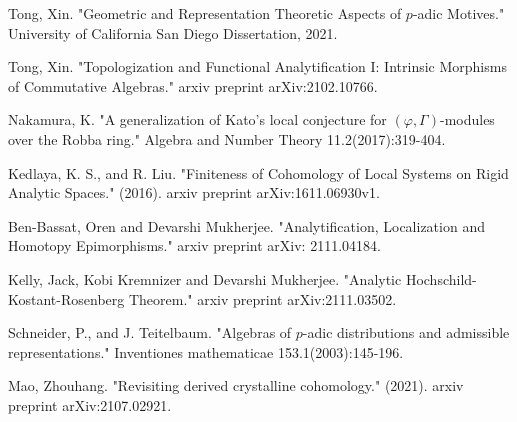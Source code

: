\documentclass[11pt]{report}
\begin{document}
\begin{thebibliography}{1}
 Tong, Xin. "Geometric and Representation Theoretic Aspects of $p$-adic Motives." University of California San Diego Dissertation, 2021.

 Tong, Xin. "Topologization and Functional Analytification I: Intrinsic Morphisms of Commutative Algebras." arxiv preprint arXiv:2102.10766. 

 Nakamura, K. "A generalization of Kato's local conjecture for $(\varphi,\Gamma)$-modules over the Robba ring." Algebra and Number Theory 11.2(2017):319-404.

 Kedlaya, K. S., and  R. Liu. "Finiteness of Cohomology of Local Systems on Rigid Analytic Spaces." (2016). arxiv preprint arXiv:1611.06930v1.


 Ben-Bassat, Oren and Devarshi Mukherjee. "Analytification, Localization and Homotopy Epimorphisms." arxiv preprint arXiv: 2111.04184.

 Kelly, Jack, Kobi Kremnizer and Devarshi Mukherjee. "Analytic Hochschild-Kostant-Rosenberg Theorem." arxiv preprint arXiv:2111.03502. 

 Schneider, P., and  J. Teitelbaum. "Algebras of $p$-adic distributions and admissible representations." Inventiones mathematicae 153.1(2003):145-196.

 Mao, Zhouhang. "Revisiting derived crystalline cohomology." (2021). arxiv preprint arXiv:2107.02921.




\end{thebibliography}
\end{document}
